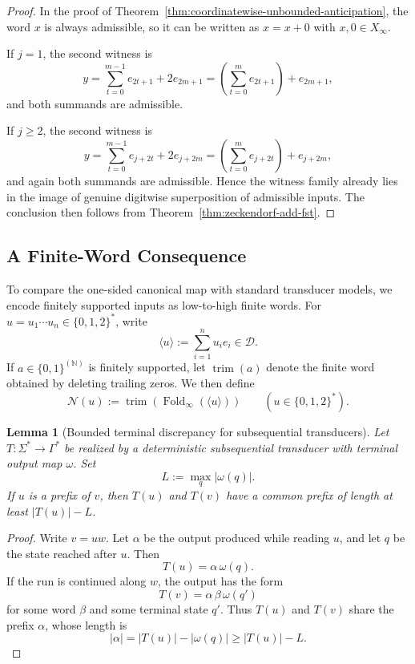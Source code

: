 \documentclass[11pt,letterpaper]{article}
\numberwithin{equation}{section}
\theoremstyle{plain}
\newtheorem{lemma}[theorem]{Lemma}
\theoremstyle{definition}
\theoremstyle{remark}
\newcommand{\D}{\mathcal{D}}
\newcommand{\NN}{\mathbb{N}}
\newcommand{\Xinf}{X_\infty}
\DeclareMathOperator{\Fold}{Fold}
\begin{document}
\begin{proof}
In the proof of Theorem~\ref{thm:coordinatewise-unbounded-anticipation}, the
word $x$ is always admissible, so it can be written as $x=x+0$ with
$x,0\in\Xinf$.

If $j=1$, the second witness is
\[
y=\sum_{t=0}^{m-1} e_{2t+1}+2e_{2m+1}
=
\left(\sum_{t=0}^{m} e_{2t+1}\right)+e_{2m+1},
\]
and both summands are admissible.

If $j\ge 2$, the second witness is
\[
y=\sum_{t=0}^{m-1} e_{j+2t}+2e_{j+2m}
=
\left(\sum_{t=0}^{m} e_{j+2t}\right)+e_{j+2m},
\]
and again both summands are admissible.  Hence the witness family already lies
in the image of genuine digitwise superposition of admissible inputs.  The
conclusion then follows from
Theorem~\ref{thm:zeckendorf-add-fst}.
\end{proof}

\subsection{A Finite-Word Consequence}

To compare the one-sided canonical map with standard transducer models, we
encode finitely supported inputs as low-to-high finite words.  For
$u=u_1\cdots u_n\in\{0,1,2\}^\ast$, write
\[
\langle u\rangle:=\sum_{i=1}^n u_i e_i\in \D.
\]
If $a\in\{0,1\}^{(\NN)}$ is finitely supported, let $\operatorname{trim}(a)$
denote the finite word obtained by deleting trailing zeros.  We then define
\[
\mathcal N(u):=\operatorname{trim}(\Fold_\infty(\langle u\rangle))
\qquad (u\in\{0,1,2\}^\ast).
\]

\begin{lemma}[Bounded terminal discrepancy for subsequential transducers]\label{lem:subseq-terminal-bound}
Let $T:\Sigma^\ast\to\Gamma^\ast$ be realized by a deterministic
subsequential transducer with terminal output map $\omega$.  Set
\[
L:=\max_q |\omega(q)|.
\]
If $u$ is a prefix of $v$, then $T(u)$ and $T(v)$ have a common prefix of
length at least $|T(u)|-L$.
\end{lemma}

\begin{proof}
Write $v=uw$.  Let $\alpha$ be the output produced while reading $u$, and let
$q$ be the state reached after $u$.  Then
\[
T(u)=\alpha\,\omega(q).
\]
If the run is continued along $w$, the output has the form
\[
T(v)=\alpha\,\beta\,\omega(q')
\]
for some word $\beta$ and some terminal state $q'$.  Thus $T(u)$ and $T(v)$
share the prefix $\alpha$, whose length is
\[
|\alpha|=|T(u)|-|\omega(q)|\ge |T(u)|-L.
\]
\end{proof}
\end{document}
